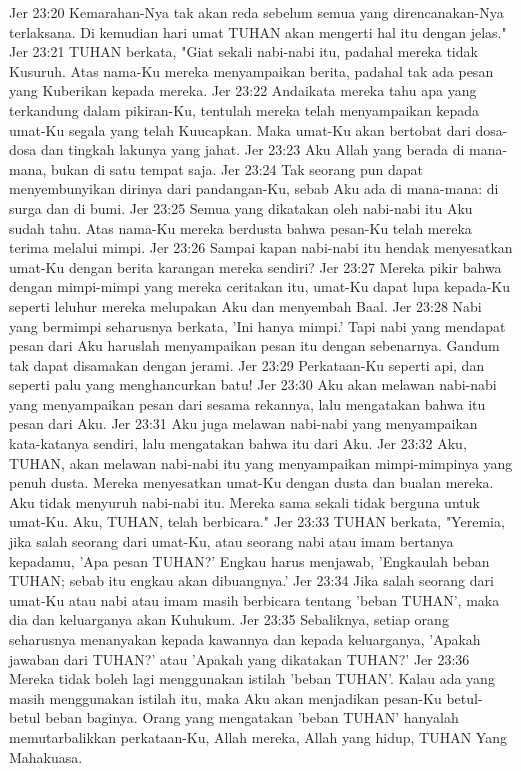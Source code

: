 Jer 23:20  Kemarahan-Nya tak akan reda sebelum semua yang direncanakan-Nya terlaksana. Di kemudian hari umat TUHAN akan mengerti hal itu dengan jelas."
Jer 23:21  TUHAN berkata, "Giat sekali nabi-nabi itu, padahal mereka tidak Kusuruh. Atas nama-Ku mereka menyampaikan berita, padahal tak ada pesan yang Kuberikan kepada mereka.
Jer 23:22  Andaikata mereka tahu apa yang terkandung dalam pikiran-Ku, tentulah mereka telah menyampaikan kepada umat-Ku segala yang telah Kuucapkan. Maka umat-Ku akan bertobat dari dosa-dosa dan tingkah lakunya yang jahat.
Jer 23:23  Aku Allah yang berada di mana-mana, bukan di satu tempat saja.
Jer 23:24  Tak seorang pun dapat menyembunyikan dirinya dari pandangan-Ku, sebab Aku ada di mana-mana: di surga dan di bumi.
Jer 23:25  Semua yang dikatakan oleh nabi-nabi itu Aku sudah tahu. Atas nama-Ku mereka berdusta bahwa pesan-Ku telah mereka terima melalui mimpi.
Jer 23:26  Sampai kapan nabi-nabi itu hendak menyesatkan umat-Ku dengan berita karangan mereka sendiri?
Jer 23:27  Mereka pikir bahwa dengan mimpi-mimpi yang mereka ceritakan itu, umat-Ku dapat lupa kepada-Ku seperti leluhur mereka melupakan Aku dan menyembah Baal.
Jer 23:28  Nabi yang bermimpi seharusnya berkata, 'Ini hanya mimpi.' Tapi nabi yang mendapat pesan dari Aku haruslah menyampaikan pesan itu dengan sebenarnya. Gandum tak dapat disamakan dengan jerami.
Jer 23:29  Perkataan-Ku seperti api, dan seperti palu yang menghancurkan batu!
Jer 23:30  Aku akan melawan nabi-nabi yang menyampaikan pesan dari sesama rekannya, lalu mengatakan bahwa itu pesan dari Aku.
Jer 23:31  Aku juga melawan nabi-nabi yang menyampaikan kata-katanya sendiri, lalu mengatakan bahwa itu dari Aku.
Jer 23:32  Aku, TUHAN, akan melawan nabi-nabi itu yang menyampaikan mimpi-mimpinya yang penuh dusta. Mereka menyesatkan umat-Ku dengan dusta dan bualan mereka. Aku tidak menyuruh nabi-nabi itu. Mereka sama sekali tidak berguna untuk umat-Ku. Aku, TUHAN, telah berbicara."
Jer 23:33  TUHAN berkata, "Yeremia, jika salah seorang dari umat-Ku, atau seorang nabi atau imam bertanya kepadamu, 'Apa pesan TUHAN?' Engkau harus menjawab, 'Engkaulah beban TUHAN; sebab itu engkau akan dibuangnya.'
Jer 23:34  Jika salah seorang dari umat-Ku atau nabi atau imam masih berbicara tentang 'beban TUHAN', maka dia dan keluarganya akan Kuhukum.
Jer 23:35  Sebaliknya, setiap orang seharusnya menanyakan kepada kawannya dan kepada keluarganya, 'Apakah jawaban dari TUHAN?' atau 'Apakah yang dikatakan TUHAN?'
Jer 23:36  Mereka tidak boleh lagi menggunakan istilah 'beban TUHAN'. Kalau ada yang masih menggunakan istilah itu, maka Aku akan menjadikan pesan-Ku betul-betul beban baginya. Orang yang mengatakan 'beban TUHAN' hanyalah memutarbalikkan perkataan-Ku, Allah mereka, Allah yang hidup, TUHAN Yang Mahakuasa.
